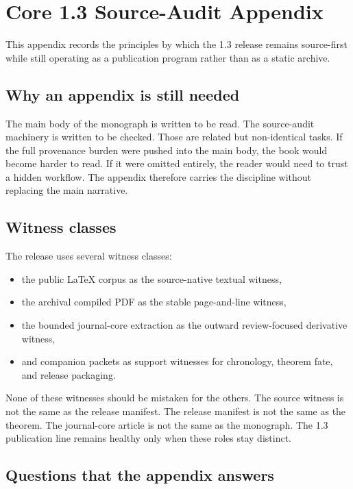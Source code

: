 \section{Core 1.3 Source-Audit Appendix}
\label{sec:oc13-source-audit-appendix}

This appendix records the principles by which the 1.3 release remains source-first while still
operating as a publication program rather than as a static archive.

\subsection{Why an appendix is still needed}

The main body of the monograph is written to be read.
The source-audit machinery is written to be checked.
Those are related but non-identical tasks.
If the full provenance burden were pushed into the main body, the book would become harder to read.
If it were omitted entirely, the reader would need to trust a hidden workflow.
The appendix therefore carries the discipline without replacing the main narrative.

\subsection{Witness classes}

The release uses several witness classes:

\begin{itemize}
\item the public LaTeX corpus as the source-native textual witness,
\item the archival compiled PDF as the stable page-and-line witness,
\item the bounded journal-core extraction as the outward review-focused derivative witness,
\item and companion packets as support witnesses for chronology, theorem fate, and release
      packaging.
\end{itemize}

None of these witnesses should be mistaken for the others.
The source witness is not the same as the release manifest.
The release manifest is not the same as the theorem.
The journal-core article is not the same as the monograph.
The 1.3 publication line remains healthy only when these roles stay distinct.

\subsection{Questions that the appendix answers}

